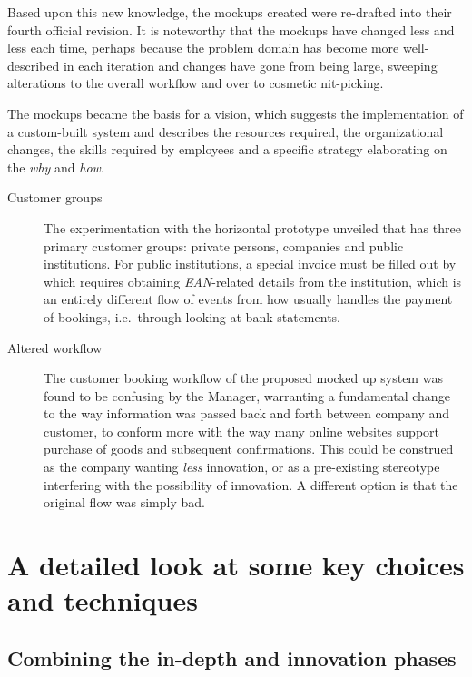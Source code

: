 Based upon this new knowledge, the mockups created were re-drafted into their
fourth official revision. It is noteworthy that the mockups have changed less
and less each time, perhaps because the problem domain has become more
well-described in each iteration and changes have gone from being large,
sweeping alterations to the overall workflow and over to cosmetic nit-picking.

The mockups became the basis for a vision, which suggests the implementation of
a custom-built system and describes the resources required, the organizational
changes, the skills required by employees and a specific strategy elaborating on
the \textit{why} and \textit{how}.

\begin{description}
    \item [Customer groups] The experimentation with the horizontal prototype unveiled that 
        \gomonkey{} has three primary customer groups: private persons, companies and public
        institutions. For public institutions, a special invoice must be filled
        out by \gomonkey{} which requires obtaining \textit{EAN}-related details
        from the institution, which is an entirely different flow of events from
        how \gomonkey{} usually handles the payment of bookings, i.e.\ through
        looking at bank statements. 
    \item [Altered workflow] The customer booking workflow of the proposed mocked up 
        system was found to be confusing by the Manager, warranting a fundamental change 
        to the way information was passed back and forth between company and customer, 
        to conform more with the way many online websites support purchase of goods and 
        subsequent confirmations. This could be construed as the company wanting
        \textit{less} innovation, or as a pre-existing stereotype interfering
        with the possibility of innovation. A different option is that the
        original flow was simply bad.
\end{description}

\section{A detailed look at some key choices and techniques} \label{sec:detailed}
\subsection{Combining the in-depth and innovation phases}

